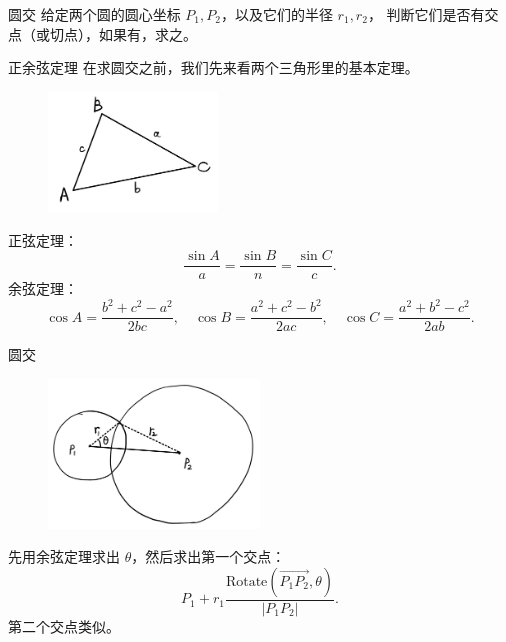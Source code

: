 \documentclass{beamer}
\begin{document}
\begin{frame}{圆交}
    \small
    给定两个圆的圆心坐标 $P_1,P_2$，以及它们的半径 $r_1,r_2$，
    判断它们是否有交点（或切点），如果有，求之。
\end{frame}

\begin{frame}{正余弦定理}
    \small
    在求圆交之前，我们先来看两个三角形里的基本定理。

    \vspace{1em}\pause
    \begin{figure}[H]
        \centering
        \includegraphics[width=0.4\textwidth]{pic/triangle.jpg}
    \end{figure}
    正弦定理：
    \begin{equation}
        \frac{\sin A}{a}=\frac{\sin B}{n}=\frac{\sin C}{c}.
    \end{equation}
    余弦定理：
    \begin{equation}
        \cos A=\frac{b^2+c^2-a^2}{2bc},\quad
        \cos B=\frac{a^2+c^2-b^2}{2ac},\quad
        \cos C=\frac{a^2+b^2-c^2}{2ab}. 
    \end{equation}
\end{frame}

\begin{frame}{圆交}
    \small
    \begin{figure}[H]
        \centering
        \includegraphics[width=0.5\textwidth]{pic/twocircle.jpg}
    \end{figure}
    先用余弦定理求出 $\theta$，\pause 然后求出第一个交点：
    \begin{equation}
        P_1+r_1\frac{\text{Rotate}(\overrightarrow{P_1P_2},\theta)}{|P_1P_2|}.
    \end{equation}
    第二个交点类似。
\end{frame}
\end{document}
